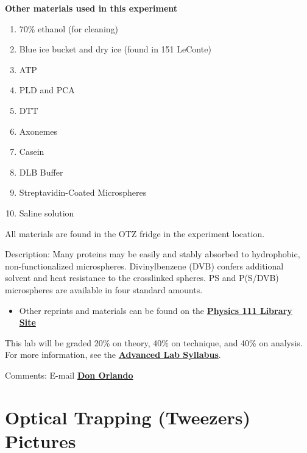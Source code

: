 \documentclass{../lab}
\begin{document}
\newpage

\textbf{Other materials used in this experiment}

\begin{enumerate}
    \item 70\% ethanol (for cleaning)

    \item Blue ice bucket and dry ice (found in 151 LeConte)

    \item ATP

    \item PLD and PCA

    \item DTT

    \item Axonemes

    \item Casein

    \item DLB Buffer

    \item Streptavidin-Coated Microspheres

    \item Saline solution
\end{enumerate}

 All materials are found in the OTZ fridge in the experiment location.

Description: Many proteins may be easily and stably absorbed to hydrophobic, non-functionalized microspheres. Divinylbenzene (DVB) confers additional solvent and heat resistance to the crosslinked spheres. PS and P(S/DVB) microspheres are available in four standard amounts.

\begin{itemize}
    \item Other reprints and materials can be found on the \href{http://physics111.lib.berkeley.edu/Physics111/Reprints/OTZ/OTZ\_index.html}{\textbf{Physics 111 Library Site}}
\end{itemize}

This lab will be graded 20\% on theory, 40\% on technique, and 40\% on analysis. For more information, see the \href{\AdvancedLabSyllabus}{\textbf{Advanced Lab Syllabus}}.

Comments: E-mail \href{\MailDonOrlando}{\textbf{Don Orlando}}

\pagebreak

\section{Optical Trapping (Tweezers) Pictures}
\end{document}
